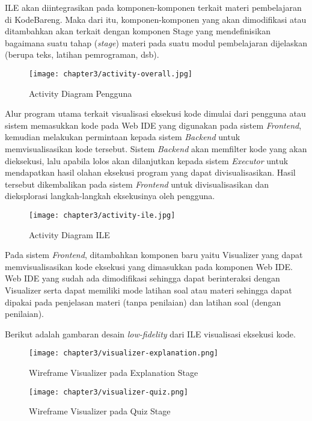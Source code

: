 ILE akan diintegrasikan pada komponen-komponen terkait materi pembelajaran di KodeBareng. Maka dari itu, komponen-komponen yang akan dimodifikasi atau ditambahkan akan terkait dengan komponen Stage yang mendefinisikan bagaimana suatu tahap (\textit{stage}) materi pada suatu modul pembelajaran dijelaskan (berupa teks, latihan pemrograman, dsb).

\begin{figure}[H]
  \centering
  \texttt{[image: chapter3/activity-overall.jpg]}
  \caption{Activity Diagram Pengguna} \label{fig:activity-overall}
\end{figure}

Alur program utama terkait visualisasi eksekusi kode dimulai dari pengguna atau sistem memasukkan kode pada Web IDE yang digunakan pada sistem \textit{Frontend}, kemudian melakukan permintaan kepada sistem \textit{Backend} untuk memvisualisasikan kode tersebut. Sistem \textit{Backend} akan memfilter kode yang akan dieksekusi, lalu apabila lolos akan dilanjutkan kepada sistem \textit{Executor} untuk mendapatkan hasil olahan eksekusi program yang dapat divisualisasikan. Hasil tersebut dikembalikan pada sistem \textit{Frontend} untuk divisualisasikan dan dieksplorasi langkah-langkah eksekusinya oleh pengguna.

\begin{figure}[H]
  \centering
  \texttt{[image: chapter3/activity-ile.jpg]}
  \caption{Activity Diagram ILE} \label{fig:activity-ile}
\end{figure}

Pada sistem \textit{Frontend}, ditambahkan komponen baru yaitu Visualizer yang dapat memvisualisasikan kode eksekusi yang dimasukkan pada komponen Web IDE. Web IDE yang sudah ada dimodifikasi sehingga dapat berinteraksi dengan Visualizer serta dapat memiliki mode latihan soal atau materi sehingga dapat dipakai pada penjelasan materi (tanpa penilaian) dan latihan soal (dengan penilaian).

Berikut adalah gambaran desain \textit{low-fidelity} dari ILE visualisasi eksekusi kode.

\begin{figure}[H]
  \centering
  \texttt{[image: chapter3/visualizer-explanation.png]}
  \caption{Wireframe Visualizer pada Explanation Stage} \label{fig:wireframe-explanation}
\end{figure}

\begin{figure}[H]
  \centering
  \texttt{[image: chapter3/visualizer-quiz.png]}
  \caption{Wireframe Visualizer pada Quiz Stage} \label{fig:wireframe-quiz}
\end{figure}

